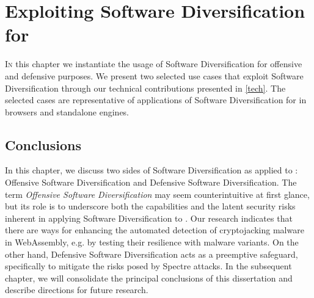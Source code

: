 \chapter{Exploiting Software Diversification for \Wasm}
\label{exploit}

\lettrine[lines=4]{I}{n} this chapter we instantiate the usage of Software Diversification for offensive and defensive purposes.
We present two selected use cases that exploit Software Diversification through our technical contributions presented in \autoref{tech}.
The selected cases are representative of applications of Software Diversification for \Wasm in browsers and standalone engines.







% 

\section*{Conclusions}

In this chapter, we discuss two sides of Software Diversification as applied to \Wasm: Offensive Software Diversification and Defensive Software Diversification.
The term \emph{Offensive Software Diversification} may seem counterintuitive at first glance, but its role is to underscore both the capabilities and the latent security risks inherent in applying Software Diversification to \Wasm.
Our research indicates that there are ways for enhancing the automated detection of cryptojacking malware in WebAssembly, e.g. by testing their resilience with \Wasm malware variants.
On the other hand, Defensive Software Diversification acts as a preemptive safeguard, specifically to mitigate the risks posed by Spectre attacks.
In the subsequent chapter, we will consolidate the principal conclusions of this dissertation and describe directions for future research.